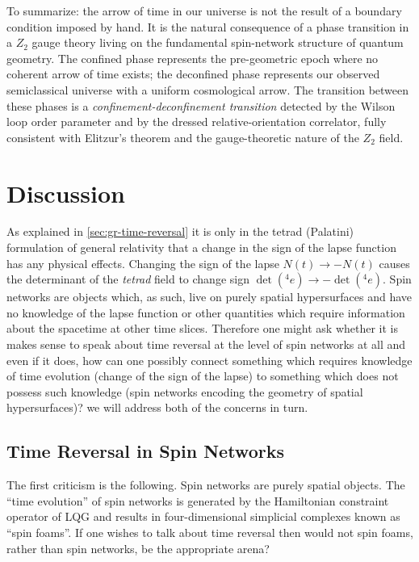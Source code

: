 \documentclass[preprint]{SciPost}
\theoremstyle{plain} %
\begin{document}
To summarize: the arrow of time in our universe is not the result of a boundary condition imposed by hand. It is the natural consequence of a phase transition in a $ Z_2 $ gauge theory living on the fundamental spin-network structure of quantum geometry. The confined phase represents the pre-geometric epoch where no coherent arrow of time exists; the deconfined phase represents our observed semiclassical universe with a uniform cosmological arrow. The transition between these phases is a \emph{confinement-deconfinement transition} detected by the Wilson loop order parameter and by the dressed relative-orientation correlator, fully consistent with Elitzur's theorem and the gauge-theoretic nature of the $ Z_2 $ field.

\section{Discussion}\label{sec:discussion}

As explained in \autoref{sec:gr-time-reversal} it is only in the tetrad (Palatini) formulation of general relativity that a change in the sign of the lapse function has any physical effects. Changing the sign of the lapse $ N(t) \rightarrow -N(t) $ causes the determinant of the \emph{tetrad} field to change sign $ \det ({}^4 e) \rightarrow - \det ({}^4 e) $. Spin networks are objects which, as such, live on purely spatial hypersurfaces and have no knowledge of the lapse function or other quantities which require information about the spacetime at other time slices. Therefore one might ask whether it is makes sense to speak about time reversal at the level of spin networks at all and even if it does, how can one possibly connect something which requires knowledge of time evolution (change of the sign of the lapse) to something which does not possess such knowledge (spin networks encoding the geometry of spatial hypersurfaces)? we will address both of the concerns in turn.

\subsection{Time Reversal in Spin Networks}

The first criticism is the following. Spin networks are purely spatial objects. The ``time evolution'' of spin networks is generated by the Hamiltonian constraint operator of LQG and results in four-dimensional simplicial complexes known as ``spin foams''. If one wishes to talk about time reversal then would not spin foams, rather than spin networks, be the appropriate arena?
\end{document}
